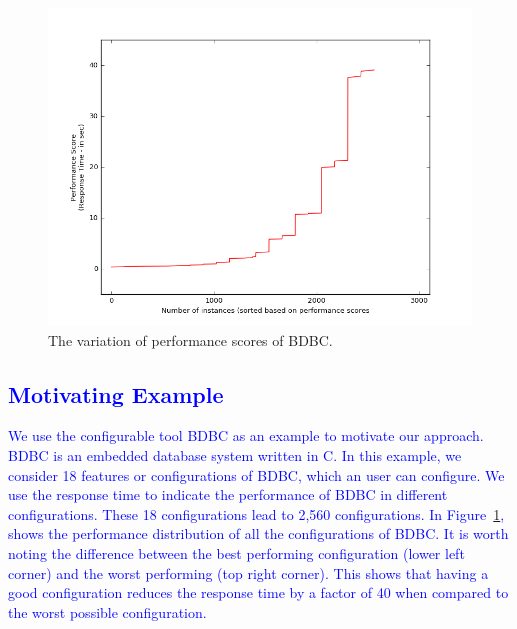 \documentclass[smallextended]{svjour3}       %
\begin{document}

\begin{figure}[t]
\centering
\includegraphics[width=\columnwidth]{Figures/motivation}
\caption{The variation of performance scores of BDBC. }
\label{fig:motivation}
\end{figure}

\textcolor{blue}{
\section{Motivating Example}
We use the configurable tool BDBC as an example to motivate our approach. BDBC is an embedded database system  written  in C. In this example, we consider 18 features or configurations of BDBC, which an user can configure. We use the response time to indicate the performance of BDBC in different configurations. These 18 configurations lead to 2,560 configurations. 
In Figure~\ref{fig:motivation}, shows the performance distribution of all the configurations of BDBC. It is worth noting the difference between the best performing configuration (lower left corner) and the worst performing (top right corner). This shows that having a good configuration reduces the response time by a factor of 40 when compared to the worst possible configuration. 
}
\end{document}
